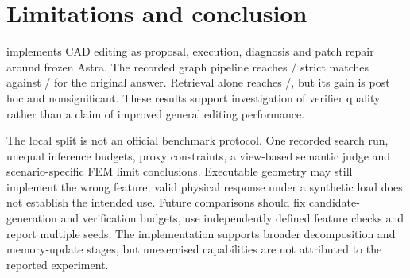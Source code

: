 \section{Limitations and conclusion}
\ours implements CAD editing as proposal, execution, diagnosis and patch repair around frozen Astra. The recorded graph pipeline reaches \pipeFull/\pipeN{} strict matches against \pipeAstra/\pipeN{} for the original answer. Retrieval alone reaches \pipeRag/\pipeN{}, but its gain is post hoc and nonsignificant. These results support investigation of verifier quality rather than a claim of improved general editing performance.

The local split is not an official benchmark protocol. One recorded search run, unequal inference budgets, proxy constraints, a view-based semantic judge and scenario-specific FEM limit conclusions. Executable geometry may still implement the wrong feature; valid physical response under a synthetic load does not establish the intended use. Future comparisons should fix candidate-generation and verification budgets, use independently defined feature checks and report multiple seeds. The implementation supports broader decomposition and memory-update stages, but unexercised capabilities are not attributed to the reported experiment.
